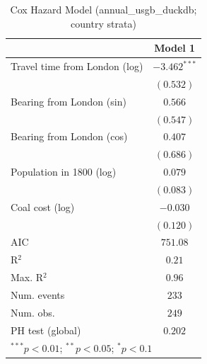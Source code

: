 
\begin{table}
\begin{center}
\begin{tabular}{l c}
\hline
 & Model 1 \\
\hline
Travel time from London (log) & $-3.462^{***}$ \\
 & $(0.532)$ \\
Bearing from London (sin) & $0.566$ \\
 & $(0.547)$ \\
Bearing from London (cos) & $0.407$ \\
 & $(0.686)$ \\
Population in 1800 (log) & $0.079$ \\
 & $(0.083)$ \\
Coal cost (log) & $-0.030$ \\
 & $(0.120)$ \\
\hline
AIC              & $751.08$ \\
R$^2$            & $0.21$ \\
Max. R$^2$       & $0.96$ \\
Num. events      & $233$ \\
Num. obs.        & $249$ \\
PH test (global) & $0.202$ \\
\hline
\multicolumn{2}{l}{\scriptsize{$^{***}p<0.01$; $^{**}p<0.05$; $^{*}p<0.1$}}
\end{tabular}
\caption{Cox Hazard Model (annual\_usgb\_duckdb; country strata)}
\label{tab:cox_serious_strata_annual_usgb_duckdb}
\end{center}
\end{table}
